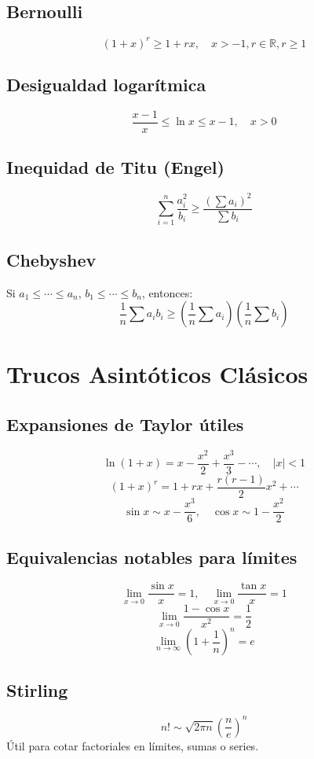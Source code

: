 \documentclass[12pt]{article}
\begin{document}
\subsection{Bernoulli}
\[
(1 + x)^r \geq 1 + rx,\quad x > -1, r \in \mathbb{R}, r \geq 1
\]

\subsection{Desigualdad logarítmica}
\[
\frac{x - 1}{x} \leq \ln x \leq x - 1,\quad x > 0
\]

\subsection{Inequidad de Titu (Engel)}
\[
\sum_{i=1}^n \frac{a_i^2}{b_i} \geq \frac{\left( \sum a_i \right)^2}{\sum b_i}
\]

\subsection{Chebyshev}
Si \(a_1 \leq \cdots \leq a_n\), \(b_1 \leq \cdots \leq b_n\), entonces:
\[
\frac{1}{n} \sum a_i b_i \geq \left( \frac{1}{n} \sum a_i \right)\left( \frac{1}{n} \sum b_i \right)
\]

\section{Trucos Asintóticos Clásicos}

\subsection{Expansiones de Taylor útiles}
\[
\ln(1 + x) = x - \frac{x^2}{2} + \frac{x^3}{3} - \cdots,\quad |x| < 1
\]
\[
(1 + x)^r = 1 + rx + \frac{r(r - 1)}{2}x^2 + \cdots
\]
\[
\sin x \sim x - \frac{x^3}{6}, \quad \cos x \sim 1 - \frac{x^2}{2}
\]

\subsection{Equivalencias notables para límites}
\[
\lim_{x \to 0} \frac{\sin x}{x} = 1, \quad \lim_{x \to 0} \frac{\tan x}{x} = 1
\]
\[
\lim_{x \to 0} \frac{1 - \cos x}{x^2} = \frac{1}{2}
\]
\[
\lim_{n \to \infty} \left(1 + \frac{1}{n}\right)^n = e
\]

\subsection{Stirling}
\[
n! \sim \sqrt{2\pi n} \left( \frac{n}{e} \right)^n
\]
Útil para cotar factoriales en límites, sumas o series.
\end{document}
